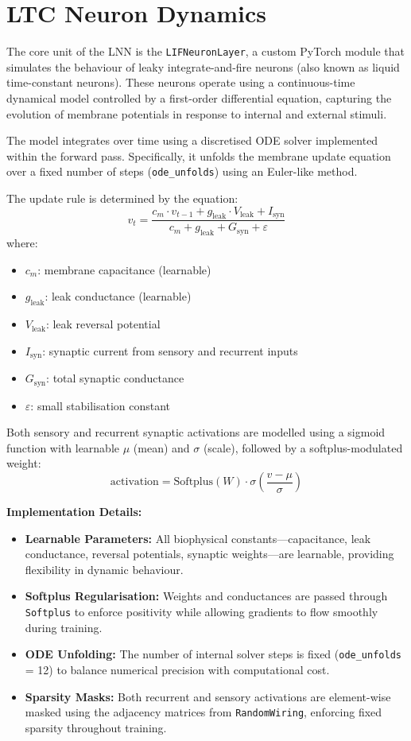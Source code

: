 \section{LTC Neuron Dynamics}
The core unit of the LNN is the \texttt{LIFNeuronLayer}, a custom PyTorch module that simulates the behaviour of leaky integrate-and-fire neurons (also known as liquid time-constant neurons). These neurons operate using a continuous-time dynamical model controlled by a first-order differential equation, capturing the evolution of membrane potentials in response to internal and external stimuli.

The model integrates over time using a discretised ODE solver implemented within the forward pass. Specifically, it unfolds the membrane update equation over a fixed number of steps (\texttt{ode\_unfolds}) using an Euler-like method.

\noindent The update rule is determined by the equation:
\[
v_t = \frac{c_m \cdot v_{t-1} + g_{\text{leak}} \cdot V_{\text{leak}} + I_{\text{syn}}}{c_m + g_{\text{leak}} + G_{\text{syn}} + \varepsilon}
\]
where:
\begin{itemize}
    \item $c_m$: membrane capacitance (learnable)
    \item $g_{\text{leak}}$: leak conductance (learnable)
    \item $V_{\text{leak}}$: leak reversal potential
    \item $I_{\text{syn}}$: synaptic current from sensory and recurrent inputs
    \item $G_{\text{syn}}$: total synaptic conductance
    \item $\varepsilon$: small stabilisation constant
\end{itemize}

\noindent Both sensory and recurrent synaptic activations are modelled using a sigmoid function with learnable $\mu$ (mean) and $\sigma$ (scale), followed by a softplus-modulated weight:
\[
\text{activation} = \text{Softplus}(W) \cdot \sigma\left( \frac{v - \mu}{\sigma} \right)
\]

\vspace{1em}
\noindent \textbf{Implementation Details:}
\begin{itemize}
    \item \textbf{Learnable Parameters:} All biophysical constants—capacitance, leak conductance, reversal potentials, synaptic weights—are learnable, providing flexibility in dynamic behaviour.
    \item \textbf{Softplus Regularisation:} Weights and conductances are passed through \texttt{Softplus} to enforce positivity while allowing gradients to flow smoothly during training.
    \item \textbf{ODE Unfolding:} The number of internal solver steps is fixed (\texttt{ode\_unfolds} = 12) to balance numerical precision with computational cost.
    \item \textbf{Sparsity Masks:} Both recurrent and sensory activations are element-wise masked using the adjacency matrices from \texttt{RandomWiring}, enforcing fixed sparsity throughout training.
\end{itemize}

